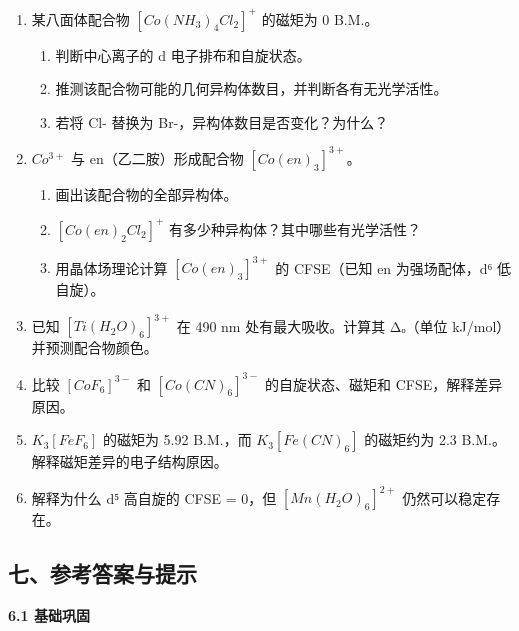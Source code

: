 \documentclass[a4paper,11pt]{ctexart}
\providecommand{\tightlist}{\setlength{\itemsep}{0pt}\setlength{\parskip}{0pt}}
\begin{document}
\begin{enumerate}
\def\labelenumi{\arabic{enumi}.}
\setcounter{enumi}{9}
\item
  某八面体配合物 \([Co(NH_3)_4Cl_2]^+\) 的磁矩为 0 B.M.。

  \begin{enumerate}
  \def\labelenumii{(\arabic{enumii})}
  \tightlist
  \item
    判断中心离子的 d 电子排布和自旋状态。
  \item
    推测该配合物可能的几何异构体数目，并判断各有无光学活性。
  \item
    若将 Cl- 替换为 Br-，异构体数目是否变化？为什么？
  \end{enumerate}
\item
  \(Co^{3+}\) 与 en（乙二胺）形成配合物 \([Co(en)_3]^{3+}\)。

  \begin{enumerate}
  \def\labelenumii{(\arabic{enumii})}
  \tightlist
  \item
    画出该配合物的全部异构体。
  \item
    \([Co(en)_2Cl_2]^+\) 有多少种异构体？其中哪些有光学活性？
  \item
    用晶体场理论计算 \([Co(en)_3]^{3+}\) 的 CFSE（已知 en 为强场配体，d⁶ 低自旋）。
  \end{enumerate}
\item
  已知 \([Ti(H_2O)_6]^{3+}\) 在 490 nm 处有最大吸收。计算其 Δₒ（单位 kJ/mol）并预测配合物颜色。
\item
  比较 \([CoF_6]^{3-}\) 和 \([Co(CN)_6]^{3-}\) 的自旋状态、磁矩和 CFSE，解释差异原因。
\item
  \(K_3[FeF_6]\) 的磁矩为 5.92 B.M.，而 \(K_3[Fe(CN)_6]\) 的磁矩约为 2.3 B.M.。解释磁矩差异的电子结构原因。
\item
  解释为什么 d⁵ 高自旋的 CFSE = 0，但 \([Mn(H_2O)_6]^{2+}\) 仍然可以稳定存在。
\end{enumerate}

\subsection{七、参考答案与提示}\label{ux4e03ux53c2ux8003ux7b54ux6848ux4e0eux63d0ux793a}

\textbf{6.1 基础巩固}
\end{document}
